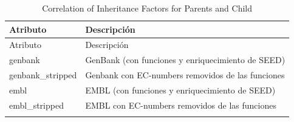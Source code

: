 \documentclass[12pt,twoside]{reedthesis}
\begin{document}
  \begin{longtable}[]{@{}ll@{}}
  \caption{Correlation of Inheritance Factors for Parents and Child
  \label{tab:inher}}\tabularnewline
  \toprule
  \begin{minipage}[b]{0.22\columnwidth}\raggedright\strut
  Atributo\strut
  \end{minipage} & \begin{minipage}[b]{0.72\columnwidth}\raggedright\strut
  Descripción\strut
  \end{minipage}\tabularnewline
  \midrule
  \endfirsthead
  \toprule
  \begin{minipage}[b]{0.22\columnwidth}\raggedright\strut
  Atributo\strut
  \end{minipage} & \begin{minipage}[b]{0.72\columnwidth}\raggedright\strut
  Descripción\strut
  \end{minipage}\tabularnewline
  \midrule
  \endhead
  \begin{minipage}[t]{0.22\columnwidth}\raggedright\strut
  genbank\strut
  \end{minipage} & \begin{minipage}[t]{0.72\columnwidth}\raggedright\strut
  GenBank (con funciones y enriquecimiento de SEED)\strut
  \end{minipage}\tabularnewline
  \begin{minipage}[t]{0.22\columnwidth}\raggedright\strut
  genbank\_stripped\strut
  \end{minipage} & \begin{minipage}[t]{0.72\columnwidth}\raggedright\strut
  Genbank con EC-numbers removidos de las funciones\strut
  \end{minipage}\tabularnewline
  \begin{minipage}[t]{0.22\columnwidth}\raggedright\strut
  embl\strut
  \end{minipage} & \begin{minipage}[t]{0.72\columnwidth}\raggedright\strut
  EMBL (con funciones y enriquecimiento de SEED)\strut
  \end{minipage}\tabularnewline
  \begin{minipage}[t]{0.22\columnwidth}\raggedright\strut
  embl\_stripped\strut
  \end{minipage} & \begin{minipage}[t]{0.72\columnwidth}\raggedright\strut
  EMBL con EC-numbers removidos de las funciones\strut
  \end{minipage}\tabularnewline
  \begin{minipage}[t]{0.22\columnwidth}\raggedright\strut

\end{minipage}
\end{longtable}
\end{document}
